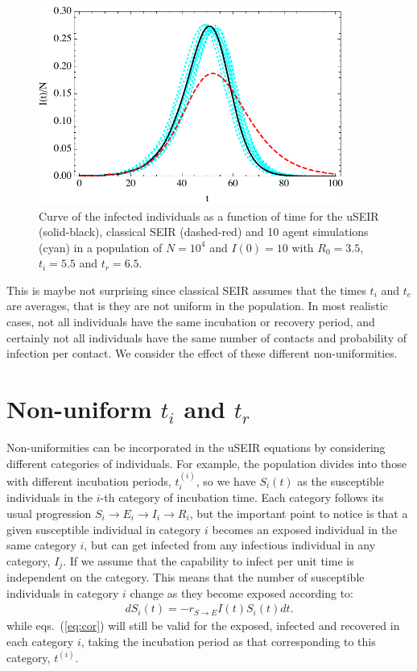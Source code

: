 \documentclass[a4paper,oneside,11pt]{article}
\begin{document}
\begin{figure}[h!]
  \centering
  \includegraphics[width=10cm]{fixedraw.pdf}
  \caption{ Curve of the infected individuals as a function of time for the uSEIR (solid-black), classical SEIR (dashed-red) and 10 agent simulations (cyan) in a  population of $N=10^4$ and $I(0)=10$ with $R_0=3.5$, $t_i=5.5$ and $t_r=6.5$.  }
  \label{fig:fixed}
   \end{figure}  
   
  This is maybe not surprising since classical SEIR assumes that the times $t_i$ and $t_e$ are averages, that is they are not uniform in the population. In most realistic cases, not all individuals have the same incubation or recovery period, and certainly not all individuals have the same number of contacts and probability of infection per contact. We consider the effect of these different non-uniformities.
   
\section{Non-uniform $t_i$ and $t_r$ }
\label{sec:titr}

 Non-uniformities can be incorporated in the uSEIR equations by considering different categories of individuals. For example, the population divides   into those with different incubation periods, $t_i^{(i)}$, so we have $S_i(t)$ as the susceptible individuals in the $i$-th category of incubation time. Each category follows its usual progression $S_i\rightarrow E_i \rightarrow I_i \rightarrow R_i$, but the important point to notice is that a given susceptible individual in category $i$ becomes an exposed individual in the same category $i$, but can get infected from any infectious individual in any category, $I_j$. If we assume that the capability to infect per unit time is independent on the category. This means that the number of susceptible individuals in category $i$ change as they become exposed according to:
\begin{eqnarray}
d S_i(t) = - r_{S\rightarrow E} I(t) S_i(t) dt.
\end{eqnarray}
while eqs.~(\ref{eq:cor}) will still be valid for the exposed, infected and recovered in each category $i$, taking the incubation period as that corresponding to this category, $t^{(i)}$. 
\end{document}
